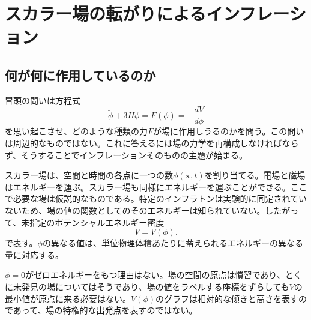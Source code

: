 \chapter{スカラー場の転がりによるインフレーション}


\section{何が何に作用しているのか}

冒頭の問いは方程式
\begin{equation}
\ddot\phi+3H\dot\phi
=F(\phi)
=-\frac{dV}{d\phi}
\label{eq:c09-opening}
\end{equation}
を思い起こさせ、どのような種類の力\(F\)が場に作用しうるのかを問う。この問いは周辺的なものではない。これに答えるには場の力学を再構成しなければならず、そうすることでインフレーションそのものの主題が始まる。

スカラー場は、空間と時間の各点に一つの数\(\phi(\mathbf x,t)\)を割り当てる。電場と磁場はエネルギーを運ぶ。スカラー場も同様にエネルギーを運ぶことができる。ここで必要な場は仮説的なものである。特定のインフラトンは実験的に同定されていないため、場の値の関数としてのそのエネルギーは知られていない。したがって、未指定のポテンシャルエネルギー密度
\begin{equation}
V=V(\phi).
\label{eq:c09-potential}
\end{equation}
で表す。\(\phi\)の異なる値は、単位物理体積あたりに蓄えられるエネルギーの異なる量に対応する。

\(\phi=0\)がゼロエネルギーをもつ理由はない。場の空間の原点は慣習であり、とくに未発見の場についてはそうであり、場の値をラベルする座標をずらしても\(V\)の最小値が原点に来る必要はない。\(V(\phi)\)のグラフは相対的な傾きと高さを表すのであって、場の特権的な出発点を表すのではない。

